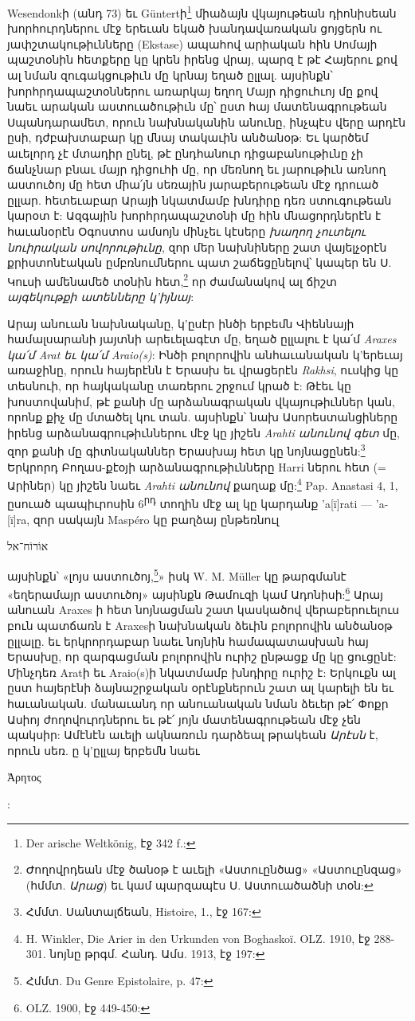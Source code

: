 \documentclass{article}
\begin{document}
{Wesendonkի (անդ 73) եւ Güntertի\footnote{Der arische Weltkönig, էջ 342 f.:} միաձայն վկայութեան դիոնիսեան խորհուրդներու մէջ երեւան եկած խանդավառական ցոյցերն ու յափշտակութիւնները (Ekstase) ապահով արիական հին Սոմայի պաշտօնին հետքերը կը կրեն իրենց վրայ, պարզ է թէ Հայերու քով ալ նման զուգակցութիւն մը կրնայ եղած ըլլալ. այսինքն՝ խորհրդապաշտօններու առարկայ եղող Մայր դիցուհւոյ մը քով նաեւ արական աստուածութիւն մը՝ ըստ հայ մատենագրութեան Սպանդարամետ, որուն նախնականին անունը, ինչպէս վերը արդէն ըսի, դժբախտաբար կը մնայ տակաւին անծանօթ: Եւ կարծեմ աւելորդ չէ մտադիր ընել, թէ ընդհանուր դիցաբանութիւնը չի ճանչնար բնաւ մայր դիցուհի մը, որ մեռնող եւ յարութիւն առնող աստուծոյ մը հետ միա՛յն սեռային յարաբերութեան մէջ դրուած ըլլար. հետեւաբար Արայի նկատմամբ խնդիրը դեռ ստուգութեան կարօտ է: Ազգային խորհրդապաշտօնի մը հին մնացորդներէն է հաւանօրէն Օգոստոս ամսոյն մինչեւ կէսերը \emph{խաղող չուտելու նուիրական սովորութիւնը}, զոր մեր նախնիները շատ վայելչօրէն քրիստոնէական ըմբռնումներու պատ շաճեցընելով՝ կապեր են Ս. Կուսի ամենամեծ տօնին հետ,\footnote{Ժողովրդեան մէջ ծանօթ է աւելի «Աստուընծաց» «Աստուընզաց» (հմմտ. \emph{Արաց}) եւ կամ պարզապէս Ս. Աստուածածնի տօն:} որ ժամանակով ալ ճիշտ \emph{այգեկութքի ատենները կ'իյնայ}:

Արայ անուան նախնականը, կ'ըսէր ինծի երբեմն Վիեննայի համալսարանի յայտնի արեւելագէտ մը, եղած ըլլալու է կա՛մ \emph{Araxes կա՛մ Arat եւ կա՛մ Araio(s)}: Ինծի բոլորովին անհաւանական կ'երեւայ առաջինը, որուն հայերէնն է Երասխ եւ վրացերէն \emph{Rakhsi}, ուսկից կը տեսնուի, որ հայկականը տառերու շրջում կրած է: Թէեւ կը խոստովանիմ, թէ քանի մը արձանագրական վկայութիւններ կան, որոնք քիչ մը մտածել կու տան. այսինքն՝ նախ Ասորեստանցիները իրենց արձանագրութիւններու մէջ կը յիշեն \emph{Arahti անունով գետ} մը, զոր քանի մը գիտնականներ Երասխայ հետ կը նոյնացընեն:\footnote{Հմմտ. Սանտալճեան, Histoire, 1., էջ 167:} Երկրորդ Բողաս-քէօյի արձանագրութիւնները Harri ներու հետ (= Արիներ) կը յիշեն նաեւ \emph{Arahti անունով} քաղաք մը:\footnote{H. Winkler, Die Arier in den Urkunden von Boghaskoï. OLZ. 1910, էջ 288-301. նոյնը թրգմ. Հանդ. Ամս. 1913, էջ 197:} Pap. Anastasi 4, 1, ըսուած պապիւրոսին 6\textsuperscript{րդ} տողին մէջ ալ կը կարդանք 'a[ï]rati — 'a-[ï]ra, զոր սակայն Maspéro կը բաղձայ ընթեռնուլ \begin{hebrewfont}אוֹרוֹח־אל\end{hebrewfont} այսինքն՝ «լոյս աստուծոյ,\footnote{Հմմտ. Du Genre Epistolaire, p. 47:}» իսկ W. M. Müller կը թարգմանէ «եղերամայր աստուծոյ» այսինքն Թամուզի կամ Ադոնիսի:\footnote{OLZ. 1900, էջ 449-450:} Արայ անուան Araxes ի հետ նոյնացման շատ կասկածով վերաբերուելուս բուն պատճառն է Araxesի նախնական ձեւին բոլորովին անծանօթ ըլլալը. եւ երկրորդաբար նաեւ նոյնին համապատասխան հայ Երասխը, որ զարգացման բոլորովին ուրիշ ընթացք մը կը ցուցընէ: Մինչդեռ Aratի եւ Araio(s)ի նկատմամբ խնդիրը ուրիշ է: Երկուքն ալ ըստ հայերէնի ձայնաշրջական օրէնքներուն շատ ալ կարելի են եւ հաւանական. մանաւանդ որ անուանական նման ձեւեր թէ՛ Փոքր Ասիոյ ժողովուրդներու եւ թէ՛ յոյն մատենագրութեան մէջ չեն պակսիր: Ամէնէն աւելի ակնառուն դարձեալ թրակեան \emph{Արէսն} է, որուն սեռ. ը կ'ըլլայ երբեմն նաեւ \begin{greek}Ἀρητος\end{greek}:

}
\end{document}
